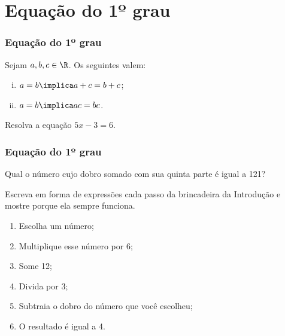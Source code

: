 
\section{Equação do 1º grau}



\begin{frame}
\frametitle{Equação do 1º grau} 

\begin{proposicao}[Propriedades]
	Sejam $a, b, c \in \R$. Os seguintes valem:
	\begin{enumerate}[i.]
		\item $a=b \implica a+c = b+c$;
		\item $a=b \implica ac = bc$.
	\end{enumerate}
\end{proposicao}\pause


\begin{exemplo}
Resolva a equação $5x - 3 = 6$.
\end{exemplo} 



\end{frame}




\begin{frame}
	\frametitle{Equação do 1º grau}

	\begin{exemplo}
		Qual o número cujo dobro somado com sua quinta parte é igual a 121?
	\end{exemplo} \pause

\begin{exemplo}
	Escreva em forma de expressões cada passo da brincadeira da
	Introdução e mostre porque ela sempre funciona.
	\begin{enumerate}
		\item Escolha um número;
		\item Multiplique esse número por 6;
		\item Some 12;
		\item Divida por 3;
		\item Subtraia o dobro do número que você escolheu;
		\item O resultado é igual a 4.
	\end{enumerate}
	\end{exemplo}

\end{frame}

